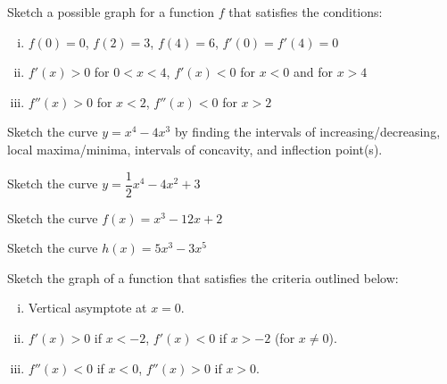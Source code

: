 \documentclass[notes]{subfiles}
\begin{document}
		\begin{ex}
			Sketch a possible graph for a function $f$ that satisfies the conditions:
				\begin{enumerate}[(i)]
					\item $f(0) = 0$, $f(2) = 3$, $f(4) = 6$, $f'(0) = f'(4) = 0$
					\item $f'(x) > 0$ for $0 < x < 4$, $f'(x) < 0$ for $x < 0$ and for $x > 4$
					\item $f''(x) > 0$ for $x < 2$, $f''(x) < 0$ for $x > 2$
				\end{enumerate}
		\end{ex}
			
		\begin{thm}
		\end{thm}

		\begin{ex}
			Sketch the curve $y = x^4-4x^3$ by finding the intervals of increasing/decreasing, local maxima/minima, intervals of concavity, and inflection point(s).
		\end{ex}
			
			\newpage
			
		\begin{ex}
			Sketch the curve $y=\dfrac{1}{2}x^4 -4x^2 + 3$
		\end{ex}
			
		\begin{ex}
			Sketch the curve $f(x)=x^3 - 12x + 2$
		\end{ex}
			\newpage
			
		\begin{ex}
			Sketch the curve $h(x) = 5x^3-3x^5$
		\end{ex}
			
		\begin{ex}
			Sketch the graph of a function that satisfies the criteria outlined below:
				\begin{enumerate}[(i)]
					\item Vertical asymptote at $x = 0$.
					\item $f'(x) > 0$ if $x < -2$, $f'(x) < 0$ if $x > -2$ (for $x\neq 0$).  
					\item $f''(x) < 0$ if $x < 0$, $f''(x) > 0$ if $x > 0$.
				\end{enumerate}
		\end{ex}
			\newpage
			
\end{document}
